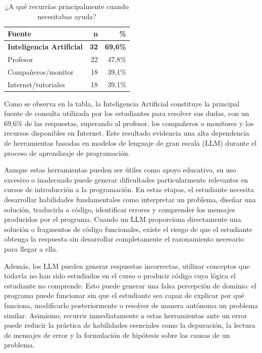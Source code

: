 \documentclass[letterpaper, 10 pt, conference]{ieeeconf}
\begin{document}
\begin{table}[ht]
	\centering
	\caption{¿A qué recurrías principalmente cuando necesitabas ayuda?}
	\label{tab:fuentes}
	\begin{tabular}{lrr}
		\hline
		\textbf{Fuente} & \textbf{n} & \textbf{\%} \\
		\hline
		\textbf{Inteligencia Artificial} & \textbf{32} & \textbf{69,6\%} \\
		Profesor & 22 & 47,8\% \\
		Compañeros/monitor & 18 & 39,1\% \\
		Internet/tutoriales & 18 & 39,1\% \\
		\hline
	\end{tabular}
\end{table}

Como se observa en la tabla, la Inteligencia Artificial constituye la principal fuente de consulta utilizada por los estudiantes para resolver sus dudas, con un 69,6\% de las respuestas, superando al profesor, los compañeros o monitores y los recursos disponibles en Internet. Este resultado evidencia una alta dependencia de herramientas basadas en modelos de lenguaje de gran escala (LLM) durante el proceso de aprendizaje de programación.

Aunque estas herramientas pueden ser útiles como apoyo educativo, su uso excesivo o inadecuado puede generar dificultades particularmente relevantes en cursos de introducción a la programación. En estas etapas, el estudiante necesita desarrollar habilidades fundamentales como interpretar un problema, diseñar una solución, traducirla a código, identificar errores y comprender los mensajes producidos por el programa. Cuando un LLM proporciona directamente una solución o fragmentos de código funcionales, existe el riesgo de que el estudiante obtenga la respuesta sin desarrollar completamente el razonamiento necesario para llegar a ella.

Además, los LLM pueden generar respuestas incorrectas, utilizar conceptos que todavía no han sido estudiados en el curso o producir código cuya lógica el estudiante no comprende. Esto puede generar una falsa percepción de dominio: el programa puede funcionar sin que el estudiante sea capaz de explicar por qué funciona, modificarlo posteriormente o resolver de manera autónoma un problema similar. Asimismo, recurrir inmediatamente a estas herramientas ante un error puede reducir la práctica de habilidades esenciales como la depuración, la lectura de mensajes de error y la formulación de hipótesis sobre las causas de un problema.
\end{document}
